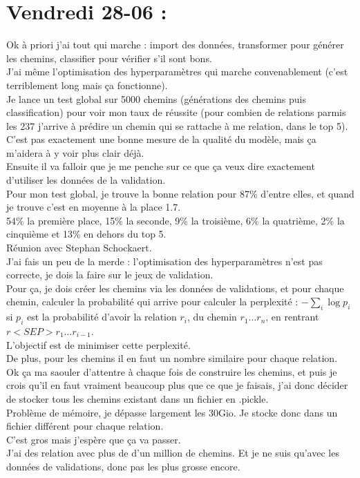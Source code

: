 \documentclass{article}
\begin{document}
\section*{Vendredi 28-06 :}
Ok à priori j'ai tout qui marche : import des données, transformer pour générer les chemins, classifier pour vérifier s'il sont bons.\\
J'ai même l'optimisation des hyperparamètres qui marche convenablement (c'est terriblement long mais ça fonctionne).\\
Je lance un test global sur 5000 chemins (générations des chemins puis classification) pour voir mon taux de réussite (pour combien de relations parmis les 237 j'arrive à prédire un chemin qui se rattache à me relation, dans le top 5).\\
C'est pas exactement une bonne mesure de la qualité du modèle, mais ça m'aidera à y voir plus clair déjà.\\
Ensuite il va falloir que je me penche sur ce que ça veux dire exactement d'utiliser les données de la validation.\\
Pour mon test global, je trouve la bonne relation pour 87\% d'entre elles, et quand je trouve c'est en moyenne à la place 1.7.\\
54\% la première place, 15\% la seconde, 9\% la troisième, 6\% la quatrième, 2\% la cinquième et 13\% en dehors du top 5.\\
Réunion avec Stephan Schockaert.\\
J'ai fais un peu de la merde : l'optimisation des hyperparamètres n'est pas correcte, je dois la faire sur le jeux de validation.\\
Pour ça, je dois créer les chemins via les données de validations, et pour chaque chemin, calculer la probabilité qui arrive pour calculer la perplexité : $-\sum_i\log p_i$ si $p_i$ est la probabilité d'avoir la relation $r_i$, du chemin $r_1\ldots r_n$, en rentrant $r <SEP> r_1 \ldots r_{i-1}$.\\
L'objectif est de minimiser cette perplexité.\\
De plus, pour les chemins il en faut un nombre similaire pour chaque relation.\\
Ok ça ma saouler d'attentre à chaque fois de construire les chemins, et puis je crois qu'il en faut vraiment beaucoup plus que ce que je faisais, j'ai donc décider de stocker tous les chemins existant dans un fichier en .pickle.\\
Problème de mémoire, je dépasse largement les 30Gio. Je stocke donc dans un fichier différent pour chaque relation.\\
C'est gros mais j'espère que ça va passer.\\
J'ai des relation avec plus de d'un million de chemins. Et je ne suis qu'avec les données de validations, donc pas les plus grosse encore.\\
\end{document}
